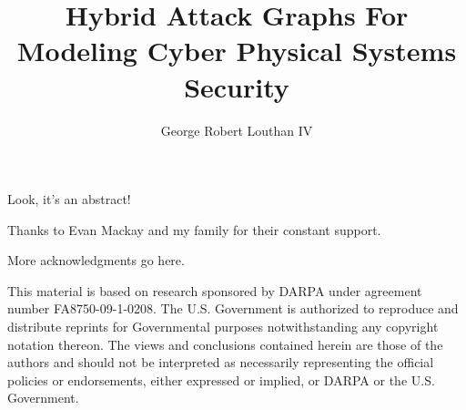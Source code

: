 \documentclass[12pt,letterpaper]{report}
\newif\iftestbox
\begin{document}
\iftestbox \testboxex \fi

%
%
\title{Hybrid Attack Graphs For Modeling Cyber Physical Systems Security}
\author{George Robert Louthan IV}

%
%
\coadvisorfalse  %

%
%


\numofpages{\pageref{LastPage}}                    %

%
%
\thesistrue  %

%
%

\copyrightfalse
\figurespagetrue   %
\tablespagetrue    %


\beforeabstract    %
\abstractp         %


%
%

Look, it's an abstract!


\acknowledgementsp
%
%
Thanks to Evan Mackay and my family for their constant support.

More acknowledgments go here.

This material is based on research sponsored by DARPA under agreement number 
FA8750-09-1-0208. The U.S. Government is authorized to reproduce and distribute 
reprints for Governmental purposes notwithstanding any copyright notation 
thereon. The views and conclusions contained herein are those of the authors and
should not be interpreted as necessarily representing the official policies or 
endorsements, either expressed or implied, or DARPA or the U.S. Government.
\end{document}
